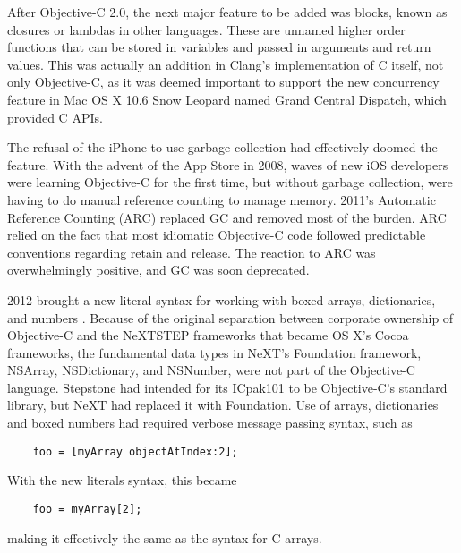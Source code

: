\documentclass[acmsmall,screen]{acmart}
\begin{document}
After Objective-C 2.0, the next major feature to be added was blocks, known as closures or lambdas in other languages. These are unnamed higher order functions that can be stored in variables and passed in arguments and return values. This was actually an addition in Clang's implementation of C itself, not only Objective-C, as it was deemed important to support the new concurrency feature in Mac OS X 10.6 Snow Leopard named Grand Central Dispatch, which provided C APIs.

The refusal of the iPhone to use garbage collection had effectively doomed the feature. With the advent of the App Store in 2008, waves of new iOS developers were learning Objective-C for the first time, but without garbage collection, were having to do manual reference counting to manage memory. 2011's Automatic Reference Counting (ARC) replaced GC and removed most of the burden. ARC relied on the fact that most idiomatic Objective-C code followed predictable conventions regarding retain and release. The reaction to ARC was overwhelmingly positive, and GC was soon deprecated. 

2012 brought a new literal syntax for working with boxed arrays, dictionaries, and numbers . Because of the original separation between corporate ownership of Objective-C and the NeXTSTEP frameworks that became OS X's Cocoa frameworks, the fundamental data types in NeXT's Foundation framework, NSArray, NSDictionary, and NSNumber, were not part of the Objective-C language. Stepstone had intended for its ICpak101 to be Objective-C's standard library, but NeXT had replaced it with Foundation. Use of arrays, dictionaries and boxed numbers had required verbose message passing syntax, such as 
\begin{verbatim}
    foo = [myArray objectAtIndex:2];
\end{verbatim}
With the new literals syntax, this became 
\begin{verbatim}
    foo = myArray[2];
\end{verbatim}
making it effectively the same as the syntax for C arrays.
\end{document}
